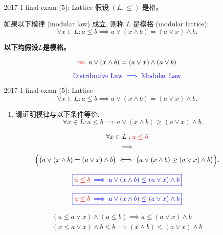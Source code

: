 \begin{frame}{}
  \begin{exampleblock}{2017-1-final-exam (5): Lattice}
    假设 $(L, \le)$ 是格。

    如果以下模律 (modular law) 成立, 则称 $L$ 是模格 (modular lattice):
    \[
      \forall x \in L: a \le b \implies a \lor (x \land b) = (a \lor x) \land b.
    \]

    \textbf{以下均假设$L$是模格。}
  \end{exampleblock}

  \pause
  \[
    \textcolor{red}{\emph{vs. }} a \lor (x \land b) = (a \lor x) \land (a \lor b)
  \]

  \pause
  \[
    \textcolor{blue}{\text{Distributive Law} \implies \text{Modular Law}}
  \]
\end{frame}

\begin{frame}{}
  \begin{exampleblock}{2017-1-final-exam (5): Lattice}
    \[
      \forall x \in L: a \le b \implies a \lor (x \land b) = (a \lor x) \land b.
    \]

    \begin{enumerate}[(1)]
      \item 请证明模律与以下条件等价:
	\[
	  \forall x \in L: a \le b \implies a \lor (x \land b) \ge (a \lor x) \land b.
	\]
    \end{enumerate}
  \end{exampleblock}

  \pause
  \begin{gather*}
    \forall x \in L: \textcolor{red}{a \le b} \\
    \implies \\
    \Big(
      \big(a \lor (x \land b) = (a \lor x) \land b\big) 
      \iff 
      \big(a \lor (x \land b) \ge (a \lor x) \land b\big)
    \Big).
  \end{gather*}

  \pause
  \[
    \textcolor{blue}{\boxed{\textcolor{red}{a \le b} \implies a \lor (x \land b) \le (a \lor x) \land b}}
  \]
\end{frame}

\begin{frame}{}
  \[
    \textcolor{blue}{\boxed{\textcolor{red}{a \le b} \implies a \lor (x \land b) \le (a \lor x) \land b}}
  \]

  \begin{gather}
    (a \le a \lor x) \land (a \le b) \implies a \le (a \lor x) \land b \\[15pt]
    (x \le a \lor x) \land b \le b \implies (x \land b) \le (a \lor x) \land b
  \end{gather}
\end{frame}

